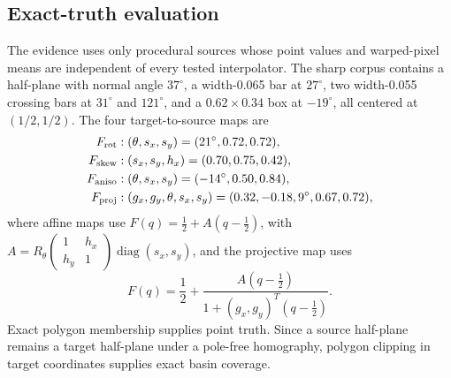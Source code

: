 \documentclass[journal]{IEEEtran}
\begin{document}
\subsection{Exact-truth evaluation}

The evidence uses only procedural sources whose point values and warped-pixel
means are independent of every tested interpolator.  The sharp corpus
contains a half-plane with normal angle \(37^\circ\), a width-0.065 bar at
\(27^\circ\), two width-0.055 crossing bars at \(31^\circ\) and
\(121^\circ\), and a \(0.62\times0.34\) box at \(-19^\circ\), all centered
at \((1/2,1/2)\).  The four target-to-source maps are
\begin{align}
 F_{\rm rot}&: (\theta,s_x,s_y)=(21^\circ,0.72,0.72),\nonumber\\
 F_{\rm skew}&: (s_x,s_y,h_x)=(0.70,0.75,0.42),\nonumber\\
 F_{\rm aniso}&: (\theta,s_x,s_y)=(-14^\circ,0.50,0.84),\nonumber\\
 F_{\rm proj}&: (g_x,g_y,\theta,s_x,s_y)
 =(0.32,-0.18,9^\circ,0.67,0.72),
 \label{eq:warpcorpusmaps}
\end{align}
where affine maps use \(F(q)=\tfrac12+A(q-\tfrac12)\), with
\(A=R_\theta\left(\begin{smallmatrix}1&h_x\\h_y&1\end{smallmatrix}\right)
\operatorname{diag}(s_x,s_y)\), and the projective map uses
\begin{equation}
 F(q)=\frac12+
 \frac{A(q-\frac12)}{1+(g_x,g_y)^T(q-\frac12)}.
 \label{eq:warpprojectivedeclared}
\end{equation}
Exact polygon membership supplies point truth.  Since a source half-plane
remains a target half-plane under a pole-free homography, polygon clipping in
target coordinates supplies exact basin coverage.
\end{document}
